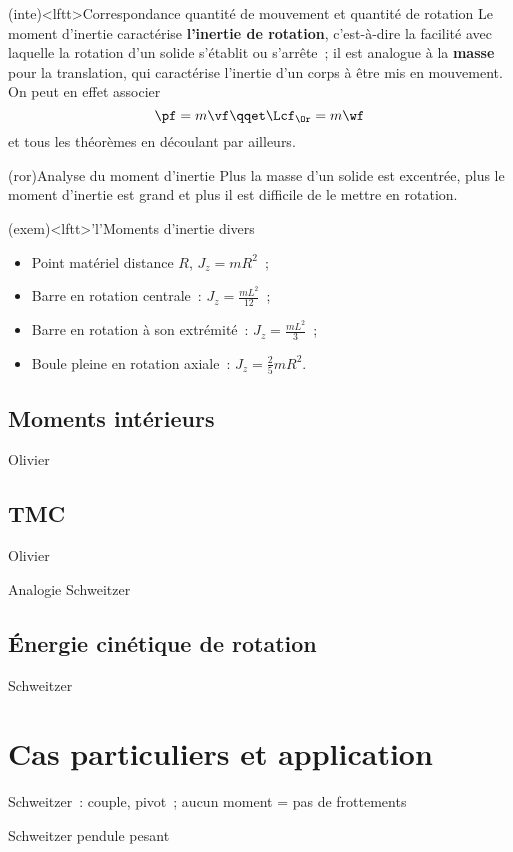 \documentclass[../../main/main.tex]{subfiles}
\begin{document}
\begin{tcb*}(inte)<lftt>{Correspondance quantité de mouvement et quantité de rotation}
	Le moment d'inertie caractérise \textbf{l'inertie de rotation}, c'est-à-dire
	la facilité avec laquelle la rotation d'un solide s'établit ou s'arrête~; il
	est analogue à la \textbf{masse} pour la translation, qui caractérise
	l'inertie d'un corps à être mis en mouvement. On peut en effet associer
	\[
		\pf = m\vf
		\qqet
		\Lcf_{\Or} = m\wf
	\]
	et tous les théorèmes en découlant par ailleurs.
\end{tcb*}

\begin{tcb*}(ror){Analyse du moment d'inertie}
	Plus la masse d'un solide est excentrée, plus le moment d'inertie
	est grand et plus il est difficile de le mettre en rotation.
\end{tcb*}

\begin{tcb*}(exem)<lftt>'l'{Moments d'inertie divers}
	\begin{itemize}
		\item Point matériel distance $R$, $J_z = mR^2$~;
		\item Barre en rotation centrale~: $J_z = \frac{mL^2}{12}$~;
		\item Barre en rotation à son extrémité~: $J_z = \frac{mL^2}{3}$~;
		\item Boule pleine en rotation axiale~: $J_z = \frac{2}{5}mR^2$.
	\end{itemize}
\end{tcb*}
\subsection{Moments intérieurs}
Olivier

\subsection{TMC}
Olivier

Analogie Schweitzer

\subsection{Énergie cinétique de rotation}
Schweitzer

\section{Cas particuliers et application}
Schweitzer~: couple, pivot~; aucun moment = pas de frottements

Schweitzer pendule pesant
\end{document}

